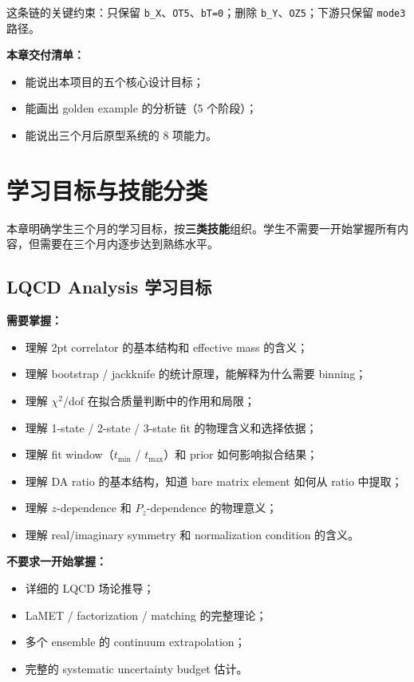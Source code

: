 \documentclass[11pt,a4paper,fontset=fandol]{ctexart}
\begin{document}
这条链的关键约束：只保留 \lstinline|b_X|、\lstinline|OT5|、\lstinline|bT=0|；删除 \lstinline|b_Y|、\lstinline|OZ5|；下游只保留 \lstinline|mode3| 路径。

\textbf{本章交付清单：}
\begin{itemize}
  \item 能说出本项目的五个核心设计目标；
  \item 能画出 golden example 的分析链（5 个阶段）；
  \item 能说出三个月后原型系统的 8 项能力。
\end{itemize}

\newpage

\section{学习目标与技能分类}

本章明确学生三个月的学习目标，按\textbf{三类技能}组织。学生不需要一开始掌握所有内容，但需要在三个月内逐步达到熟练水平。

\subsection{LQCD Analysis 学习目标}

\textbf{需要掌握：}
\begin{itemize}
  \item 理解 2pt correlator 的基本结构和 effective mass 的含义；
  \item 理解 bootstrap / jackknife 的统计原理，能解释为什么需要 binning；
  \item 理解 $\chi^2$/dof 在拟合质量判断中的作用和局限；
  \item 理解 1-state / 2-state / 3-state fit 的物理含义和选择依据；
  \item 理解 fit window（$t_{\min}$ / $t_{\max}$）和 prior 如何影响拟合结果；
  \item 理解 DA ratio 的基本结构，知道 bare matrix element 如何从 ratio 中提取；
  \item 理解 $z$-dependence 和 $P_z$-dependence 的物理意义；
  \item 理解 real/imaginary symmetry 和 normalization condition 的含义。
\end{itemize}

\textbf{不要求一开始掌握：}
\begin{itemize}
  \item 详细的 LQCD 场论推导；
  \item LaMET / factorization / matching 的完整理论；
  \item 多个 ensemble 的 continuum extrapolation；
  \item 完整的 systematic uncertainty budget 估计。
\end{itemize}
\end{document}
